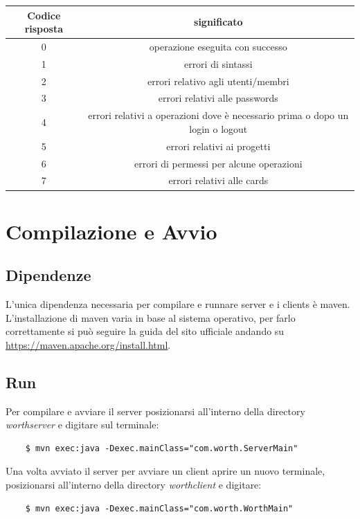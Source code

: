 \documentclass[11pt]{report}
\begin{document}
	\begin{center}
		\begin{tabular}{ |c|c| } 
			\hline
			Codice risposta & significato \\
			\hline\hline
			0	& operazione eseguita con successo \\
			\hline
			1	& errori di sintassi \\
			\hline
			2	& errori relativo agli utenti/membri \\
			\hline
			3	& errori relativi alle passwords \\
			\hline
			4	& errori relativi a operazioni dove è necessario prima o dopo un login o logout \\
			\hline
			5	& errori relativi ai progetti \\
			\hline
			6	& errori di permessi per alcune operazioni \\
			\hline
			7	& errori relativi alle cards \\
			\hline
		\end{tabular}
	\end{center}

	\chapter{Compilazione e Avvio}
	
	\section{Dipendenze}
	L'unica dipendenza necessaria per compilare e runnare server e i clients è maven.\\
	L'installazione di maven varia in base al sistema operativo, per farlo correttamente si può seguire la guida del sito ufficiale andando su  \href{https://maven.apache.org/install.html}{https://maven.apache.org/install.html}.
	
	\section{Run}
	Per compilare e avviare il server posizionarsi all'interno della directory \textit{worthserver} e digitare sul terminale:
	\begin{lstlisting}
	$ mvn exec:java -Dexec.mainClass="com.worth.ServerMain"
	\end{lstlisting}
	
	Una volta avviato il server per avviare un client aprire un nuovo terminale, posizionarsi all'interno della directory \textit{worthclient} e digitare:
	\begin{lstlisting}
	$ mvn exec:java -Dexec.mainClass="com.worth.WorthMain"
	\end{lstlisting}
	
	
	
	

	
	
	
	
	 
	
	
	 
	
	
	
	
	
	
\end{document}
